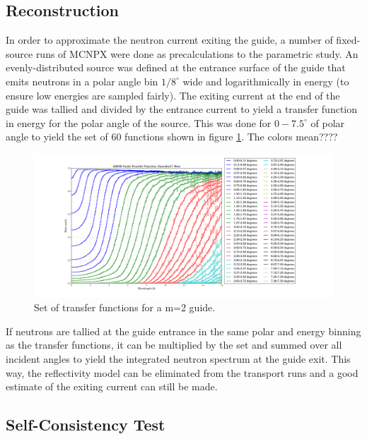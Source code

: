 \documentclass[a4paper]{jpconf}
\begin{document}
\subsection{Reconstruction}

In order to approximate the neutron current exiting the guide, a number of fixed-source runs of MCNPX were done as precalculations to the parametric study.  An evenly-distributed source was defined at the entrance surface of the guide that emits neutrons in a polar angle bin $1/8^\circ$ wide and logarithmically in energy (to ensure low energies are sampled fairly).  The exiting current at the end of the guide was tallied and divided by the entrance current to yield a transfer function in energy for the polar angle of the source.  This was done for $0-7.5^\circ$ of polar angle to yield the set of 60 functions shown in figure \ref{xfer_func}.  The colors mean????

\begin{figure}
\begin{center}
\includegraphics[scale=0.3,trim={2cm 1.7cm 2cm 0.8cm},clip]{graphics/xfer_func.pdf}
\end{center}
\caption{\label{xfer_func}Set of transfer functions for a m=2 guide.}
\end{figure}

If neutrons are tallied at the guide entrance in the same polar and energy binning as the transfer functions, it can be multiplied by the set and summed over all incident angles to yield the integrated neutron spectrum at the guide exit.  This way, the reflectivity model can be eliminated from the transport runs and a good estimate of the exiting current can still be made.

\subsection{Self-Consistency Test}
\end{document}
